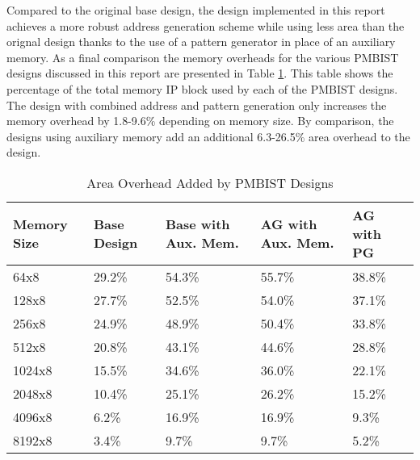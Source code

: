 Compared to the original base design, the design implemented in this report achieves a more robust address generation scheme while using less area than the orignal design thanks to the use of a pattern generator in place of an auxiliary memory.  As a final comparison the memory overheads for the various PMBIST designs discussed in this report are presented in Table \ref{tab:all_overhead}.  This table shows the percentage of the total memory IP block used by each of the PMBIST designs.  The design with combined address and pattern generation only increases the memory overhead by 1.8-9.6\% depending on memory size.  By comparison, the designs using auxiliary memory add an additional 6.3-26.5\% area overhead to the design.  

\begin{table}[h]
\caption{Area Overhead Added by PMBIST Designs}
\centering
\begin{tabular}{|p{0.75in}| p{0.6in}| p{0.9in}| p{0.9in}| p{0.6in}|}
\hline
Memory Size & Base Design & Base with Aux. Mem. & AG with Aux. Mem. & AG with PG  \\
\hline\hline
64x8   & 29.2\% & 54.3\% & 55.7\% & 38.8\% \\
128x8  & 27.7\% & 52.5\% & 54.0\% & 37.1\% \\
256x8  & 24.9\% & 48.9\% & 50.4\% & 33.8\% \\
512x8  & 20.8\% & 43.1\% & 44.6\% & 28.8\% \\
1024x8 & 15.5\% & 34.6\% & 36.0\% & 22.1\% \\
2048x8 & 10.4\% & 25.1\% & 26.2\% & 15.2\% \\
4096x8 &  6.2\% & 16.9\% & 16.9\% &  9.3\% \\
8192x8 &  3.4\% &  9.7\% &  9.7\% &  5.2\% \\ [0.5ex]
\hline
\end{tabular}
\label{tab:all_overhead}
\end{table}




